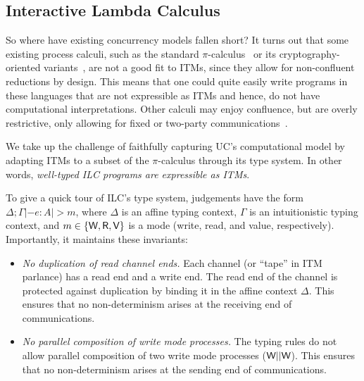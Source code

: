 
\subsection{Interactive Lambda Calculus}

So where have existing concurrency models fallen short?  It turns out that some
existing process calculi, such as the standard
$\pi$-calculus~\cite{milner1999communicating} or its cryptography-oriented
variants~\cite{abadi1999calculus, abadi2001mobile}, are not a good fit to ITMs,
since they allow for non-confluent reductions by design. This means that one
could quite easily write programs in these languages that are not expressible as
ITMs and hence, do not have computational interpretations. Other calculi may
enjoy confluence, but are overly restrictive, only allowing for fixed or
two-party
communications~\cite{kobayashi1999linearity,bohl2016symbolic,fowler2018session}. 

We take up the challenge of faithfully capturing UC's computational model by
adapting ITMs to a subset of the $\pi$-calculus through its type system. In other
words, \emph{well-typed ILC programs are expressible as ITMs}.

To give a quick tour of ILC's type system, judgements have the form $\Delta ; \Gamma |- e
: A |> m$, where $\Delta$ is an affine typing context, $\Gamma$ is an intuitionistic typing
context, and $m \in \{\textsf{W}, \textsf{R}, \textsf{V}\}$ is a mode (write, read, and value,
respectively). Importantly, it maintains these invariants:

\begin{itemize}[leftmargin=*]
\item \emph{No duplication of read channel ends.} Each channel (or ``tape'' in
  ITM parlance) has a read end and a write end. The read end of the channel is
  protected against duplication by binding it in the affine context $\Delta$. This
  ensures that no non-determinism arises at the receiving end of communications.

\item \emph{No parallel composition of write mode processes.} The typing rules
  do not allow parallel composition of two write mode processes ($\textsf{W} ||
  \textsf{W}$). This ensures that no non-determinism arises at the sending end of
  communications.
\end{itemize}

